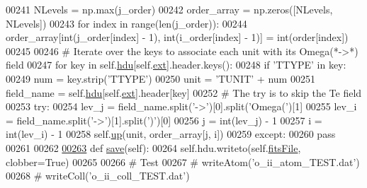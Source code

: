 \begin{DoxyCode}
00241         NLevels = np.max(j\_order)
00242         order\_array = np.zeros([NLevels, NLevels])
00243         \textcolor{keywordflow}{for} index \textcolor{keywordflow}{in} range(len(j\_order)):
00244             order\_array[int(j\_order[index] - 1), int(i\_order[index] - 1)] = int(order[index])
00245             
00246         \textcolor{comment}{# Iterate over the keys to associate each unit with its Omega(*->*) field}
00247         \textcolor{keywordflow}{for} key \textcolor{keywordflow}{in} self.\hyperlink{classpyneb_1_1utils_1_1fits_1_1_hdr_a23de98701ac30e7c56654f92d9956fca}{hdu}[self.\hyperlink{classpyneb_1_1utils_1_1fits_1_1_hdr_a1c2f102effab05a497e3a21ed3291359}{ext}].header.keys():
00248             \textcolor{keywordflow}{if} \textcolor{stringliteral}{'TTYPE'} \textcolor{keywordflow}{in} key:
00249                 num = key.strip(\textcolor{stringliteral}{'TTYPE'})
00250                 unit = \textcolor{stringliteral}{'TUNIT'} + num
00251                 field\_name = self.\hyperlink{classpyneb_1_1utils_1_1fits_1_1_hdr_a23de98701ac30e7c56654f92d9956fca}{hdu}[self.\hyperlink{classpyneb_1_1utils_1_1fits_1_1_hdr_a1c2f102effab05a497e3a21ed3291359}{ext}].header[key]
00252                 \textcolor{comment}{# The try is to skip the Te field}
00253                 \textcolor{keywordflow}{try}:
00254                     lev\_j = field\_name.split(\textcolor{stringliteral}{'->'})[0].split(\textcolor{stringliteral}{'Omega('})[1]
00255                     lev\_i = field\_name.split(\textcolor{stringliteral}{'->'})[1].split(\textcolor{stringliteral}{')'})[0]
00256                     j = int(lev\_j) - 1
00257                     i = int(lev\_i) - 1
00258                     self.\hyperlink{classpyneb_1_1utils_1_1fits_1_1_hdr_aae5b01b9bc70e2787f31825ff63152a6}{up}(unit, order\_array[j, i])
00259                 \textcolor{keywordflow}{except}:
00260                     \textcolor{keywordflow}{pass}
00261 
00262 
\hypertarget{fits_8py_source_l00263}{}\hyperlink{classpyneb_1_1utils_1_1fits_1_1_hdr_ae194eaf4a7c6a8aed7926ebad50d7901}{00263}     \textcolor{keyword}{def }\hyperlink{classpyneb_1_1utils_1_1fits_1_1_hdr_ae194eaf4a7c6a8aed7926ebad50d7901}{save}(self):
00264         self.hdu.writeto(self.\hyperlink{classpyneb_1_1utils_1_1fits_1_1_hdr_a7c4dc491907edb52649262563df2e23c}{fitsFile}, clobber=\textcolor{keyword}{True})
00265 
00266 \textcolor{comment}{# Test}
00267 \textcolor{comment}{# writeAtom('o\_ii\_atom\_TEST.dat')}
00268 \textcolor{comment}{# writeColl('o\_ii\_coll\_TEST.dat')}
\end{DoxyCode}
